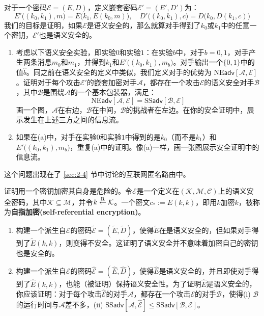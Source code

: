\begin{exercise}[嵌套加密]\label{exer:2-15}
对于一个密码$\mathcal{E}=(E,D)$，定义嵌套密码$\mathcal{E}'=(E',D')$为：
\[
E'\big((k_0,k_1),m\big)=E\big(k_1,E(k_0,m)\big),\quad
D'\big((k_0,k_1),c\big)=D\big(k_0,D(k_1,c)\big)
\]
我们的目标是证明，如果$\mathcal{E}$是语义安全的，那么就算对手得到了$k_0$或$k_1$中的任意一个密钥，$\mathcal{E}'$也是语义安全的。
\begin{enumerate}[\indent(a)]
	\item 考虑以下语义安全实验，即实验$0$和实验$1$：在实验$b$中，对于$b=0,1$，对手产生两条消息$m_0$和$m_1$，并得到$k_1$和$E'\big((k_0,k_1),m_b\big)$。对手输出一个$\{0,1\}$中的值$\hat b$。同之前在语义安全的定义中类似，我们定义对手的优势为 $\mathrm{NE}\mathsf{adv}[\mathcal{A},\mathcal{E}]$。证明对于每个攻击$\mathcal{E}'$的嵌套加密对手$\mathcal{A}$，都存在一个攻击$\mathcal{E}$的语义安全对手$\mathcal{B}$，其中$\mathcal{B}$是围绕$\mathcal{A}$的一个基本包装器，满足：
	\[
	\mathrm{NE}\mathsf{adv}[\mathcal{A},\mathcal{E}]=\mathrm{SS}\mathsf{adv}[\mathcal{B},\mathcal{E}]
	\]
	画一个图，$\mathcal{A}$在右边，$\mathcal{B}$在中间，$\mathcal{B}$的挑战者在左边。在你的安全证明中，展示发生在上述三方之间的信息流。
	\item 如果在(a)中，对手在实验$0$和实验$1$中得到的是$k_0$（而不是$k_1$）和$E'\big((k_0,k_1),m_b\big)$，重复(a)中的证明。像(a)一样，画一张图展示安全证明中的信息流。
\end{enumerate}
这个问题出现在了 \ref{sec:2-4} 节中讨论的互联网匿名路由中。
\end{exercise}

\begin{exercise}[自指加密]
证明用一个密钥加密其自身是危险的。令$\mathcal{E}$是一个定义在$(\mathcal{K},\mathcal{M},\mathcal{C})$上的语义安全密码，其中$\mathcal{K}\subseteq\mathcal{M}$，并令$k\overset{\rm R}\leftarrow\mathcal{K}$。一个密文$c_*:=E(k,k)$，即用$k$加密$k$，被称为\textbf{自指加密(self-referential encryption)}。
\begin{enumerate}[\indent(a)]
	\item 构建一个派生自$\mathcal{E}$的密码$\mathcal{\tilde{E}}=(\tilde{E},\tilde{D})$，使得$\tilde{E}$在是语义安全的，但如果对手得到了$\tilde{E}(k,k)$，则变得不安全。这证明了语义安全并不意味着加密自己的密钥也是安全的。
	\item 构建一个派生自$\mathcal{E}$的密码$\mathcal{\hat{E}}=(\hat{E},\hat{D})$，使得$\hat{E}$是语义安全的，并且即使对手得到了$\hat{E}(k,k)$，也能（被证明）保持语义安全性。为了证明$\hat{E}$是语义安全的，你应该证明：对于每个攻击$\mathcal{\hat{E}}$的对手$\mathcal{A}$，都存在一个攻击$\mathcal{E}$的对手$\mathcal{B}$，使得(i) $\mathcal{B}$的运行时间与$\mathcal{A}$差不多，(ii) $\mathrm{SS}\mathsf{adv}[\mathcal{A},\mathcal{\hat{E}}]\leq\mathrm{SS}\mathsf{adv}[\mathcal{B},\mathcal{E}]$。
\end{enumerate}
\end{exercise}

